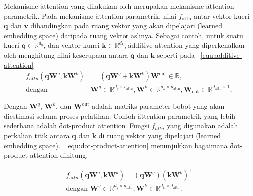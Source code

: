 	Mekanisme \f{attention} yang dilakukan oleh \cite{transformerori} merupakan mekanisme \f{attention} parametrik. Pada mekanisme \f{attention} parametrik, nilai $f_{\text{attn}}$ antar vektor kueri $\mathbf{q}$ dan $\mathbf{v}$ dibandingkan pada ruang vektor yang akan dipelajari (\f{learned embedding space}) daripada ruang vektor aslinya. Sebagai contoh, untuk suatu kueri $\mathbf{q}\in \mathbb{R}^{d_q}$, dan vektor kunci $\mathbf{k} \in \mathbb{R}^{d_k}$, \f{additive attention} yang diperkenalkan oleh \cite{bahdanau2016neural} menghitung nilai keserupaan antara $\mathbf{q}$ dan $\mathbf{k}$ seperti pada \equ~\ref{equ:additive-attention}
	\begin{align}
	\label{equ:additive-attention}
	f_{attn}(\mathbf{q} \mathbf{W}^q, \mathbf{k} \mathbf{W}^k) &= (\mathbf{q} \mathbf{W}^q  + \mathbf{k} \mathbf{W}^k)  \mathbf{W}^{\text{out}} \in \mathbb{R}, \\
	\text{dengan } &\mathbf{W}^q \in \mathbb{R}^{d_q \times d_{\text{attn}}}, \mathbf{W}^k \in \mathbb{R}^{d_k \times d_{\text{attn}}}, \mathbf{W}_{\text{out}} \in \mathbb{R}^{d_{\text{attn}} \times 1},
	\end{align}

	Dengan $\mathbf{W}^q$, $\mathbf{W}^k$, dan $\mathbf{W}^{\text{out}}$ adalah matriks parameter bobot yang akan diestimasi selama proses pelatihan. Contoh \f{attention} parametrik yang lebih sederhana adalah \f{dot-product attention}. Fungsi $f_{attn}$ yang digunakan adalah perkalian titik antara $\mathbf{q}$ dan $\mathbf{k}$ di ruang vektor yang dipelajari (\f{learned embedding space}). \equ~\ref{equ:dot-product-attention} menunjukkan bagaimana \f{dot-product attention} dihitung.

	\begin{align}
		\label{equ:dot-product-attention}
		f_{attn}(\mathbf{q} \mathbf{W}^q, \mathbf{k} \mathbf{W}^k) = (\mathbf{q} \mathbf{W}^q) (\mathbf{k} \mathbf{W}^k)^{\top}\\
		\text{dengan } \mathbf{W}^q \in \mathbb{R}^{d_q \times d_{\text{attn}}}, \mathbf{W}^k \in \mathbb{R}^{d_k \times d_{\text{attn}}}.
	\end{align}

